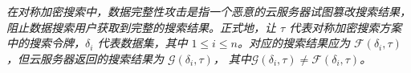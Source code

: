 \begin{definition}\label{def:integrity}
    {\itshape
			在对称加密搜索中，数据完整性攻击是指一个恶意的云服务器试图篡改搜索结果，阻止数据搜索用户获取到完整的搜索结果。正式地，让 $\tau$ 代表对称加密搜索方案中的搜索令牌，$\delta_i$ 代表数据集，其中 $1 \le i \le n$。对应的搜索结果应为 $\mathcal{F}(\delta_i, \tau)$，但云服务器返回的搜索结果为 $\mathcal{G}(\delta_i, \tau)$， 其中$\mathcal{G}(\delta_i, \tau) \neq \mathcal{F}(\delta_i, \tau)$。
    }
\end{definition}




